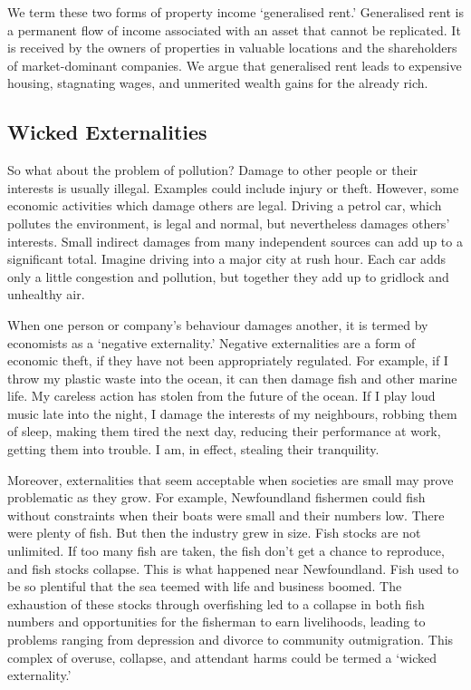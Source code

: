 \documentclass[]{tufte-handout}
\begin{document}
We term these two forms of property income `generalised rent.'
Generalised rent is a permanent flow of income associated with an asset
that cannot be replicated. It is received by the owners of properties in
valuable locations and the shareholders of market-dominant companies. We
argue that generalised rent leads to expensive housing, stagnating
wages, and unmerited wealth gains for the already rich.

\hypertarget{wicked-externalities}{%
\subsection{Wicked Externalities}\label{wicked-externalities}}

So what about the problem of pollution? Damage to other people or their
interests is usually illegal. Examples could include injury or theft.
However, some economic activities which damage others are legal. Driving
a petrol car, which pollutes the environment, is legal and normal, but
nevertheless damages others' interests. Small indirect damages from many
independent sources can add up to a significant total. Imagine driving
into a major city at rush hour. Each car adds only a little congestion
and pollution, but together they add up to gridlock and unhealthy air.

When one person or company's behaviour damages another, it is termed by
economists as a `negative externality.' Negative externalities are a
form of economic theft, if they have not been appropriately regulated.
For example, if I throw my plastic waste into the ocean, it can then
damage fish and other marine life. My careless action has stolen from
the future of the ocean. If I play loud music late into the night, I
damage the interests of my neighbours, robbing them of sleep, making
them tired the next day, reducing their performance at work, getting
them into trouble. I am, in effect, stealing their tranquility.

Moreover, externalities that seem acceptable when societies are small
may prove problematic as they grow. For example, Newfoundland fishermen
could fish without constraints when their boats were small and their
numbers low. There were plenty of fish. But then the industry grew in
size. Fish stocks are not unlimited. If too many fish are taken, the
fish don't get a chance to reproduce, and fish stocks collapse. This is
what happened near Newfoundland. Fish used to be so plentiful that the
sea teemed with life and business boomed. The exhaustion of these stocks
through overfishing led to a collapse in both fish numbers and
opportunities for the fisherman to earn livelihoods, leading to problems
ranging from depression and divorce to community outmigration. This
complex of overuse, collapse, and attendant harms could be termed a
`wicked externality.'
\end{document}
